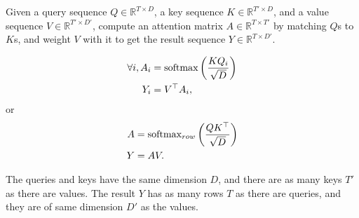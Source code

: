 \documentclass[c,8pt]{beamer}
\begin{document}
\begin{frame}{}

Given a query sequence $Q \in \mathbb{R}^{T \times D}$, a key sequence
$K \in \mathbb{R}^{T' \times D}$, and a value sequence $V \in
\mathbb{R}^{T' \times D'}$, compute an attention matrix $A \in
\mathbb{R}^{T \times T'}$ by matching $Q$s to $K$s, and weight $V$
with it to get the result sequence $Y \in \mathbb{R}^{T \times D'}$.

\begin{align*}
\forall i, A_i & = \operatorname{softmax} \left( \frac{K Q_i}{\sqrt{D}} \right) \\
Y_i            & = V^{\top} A_i,
\end{align*}
%
or
%
\begin{align*}
A & = \operatorname{softmax}_{row} \left( \frac{Q K^{\top}}{\sqrt{D}} \right) \\
Y & = A V.
\end{align*}

The queries and keys have the same dimension $D$, and there are as
many keys $T'$ as there are values. The result $Y$ has as many rows
${T}$ as there are queries, and they are of same dimension ${D'}$ as
the values.

\end{frame}

\end{document}
